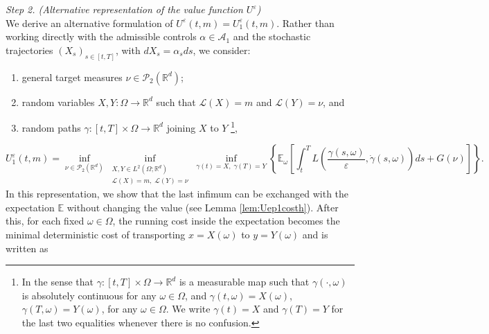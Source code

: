 \documentclass[reqno,11pt]{amsart}
\numberwithin{equation}{section}
\newcommand{\R}{\mathbb{R}} %
\newcommand{\e}{\varepsilon}
\newcommand{\nd}{\noindent}
\begin{document}
    \nd
    \textit{Step 2. (Alternative representation of the value function $U^\e$)}\\
    We derive an alternative formulation of $U^\e(t,m)=U_1^\varepsilon(t,m)$. Rather than working directly with the admissible controls $\alpha\in \mathcal{A}_1$ and the stochastic trajectories $(X_s)_{s\in [t,T]}$, with $dX_s=\alpha_sds$, we consider:
    \begin{enumerate}
    \item general target measures $\nu \in \mathcal{P}_2(\R^d)$;
    \item random variables $X,Y\colon \Omega\to \R^d$ such that $\mathcal{L}(X)=m$ and $\mathcal{L}(Y)=\nu$, and
    \item random paths $\gamma:[t,T]\times\Omega\to\mathbb{R}^d$ joining $X$ to $Y$
    \footnote{In the sense that $\gamma\colon [t,T]\times \Omega\to \R^d$ is a measurable map such that $\gamma(\cdot,\omega)$ is absolutely continuous for any $\omega\in \Omega$, and $\gamma(t,\omega)=X(\omega)$,  $\gamma(T,\omega)=Y(\omega)$, for any $\omega\in \Omega$. We write $\gamma(t)=X$ and $\gamma(T)=Y$ for the last two equalities whenever there is no confusion.},
    \end{enumerate}
    $$U_1^\e(t,m)=\inf_{\nu\in \mathcal{P}_2(\R^d)}\inf_{\substack{X,Y\in L^2(\Omega;\R^d)\\ \mathcal{L}(X)=m,\;\mathcal{L}(Y)=\nu}}\inf_{ \gamma(t)=X,\;\gamma(T)=Y}\left\{\mathbb{E}_\omega\left[\int_t^TL\left(\frac{\gamma(s,\omega)}{\e},\dot{\gamma}(s,\omega)   \right)ds +G(\nu)\right]\right\}.$$
    In this representation, we show that the last infimum can be exchanged with the expectation $\mathbb{E}$ without changing the value (see Lemma \ref{lem:Uep1costh}). After this, for each fixed $\omega\in \Omega$, the running cost inside the expectation becomes the minimal deterministic cost of transporting $x=X(\omega)$ to $y=Y(\omega)$ and is written as
\end{document}
